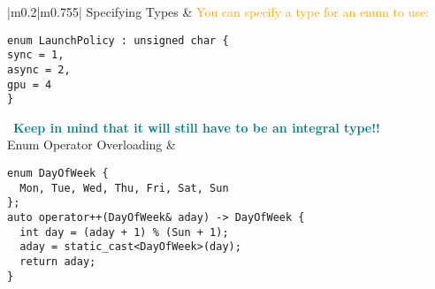 \documentclass[main.tex,fontsize=8pt,paper=a4,paper=portrait,DIV=calc,]{scrartcl}
\begin{document}
\begin{table}[ht!]
\begin{tabular}{|m{0.2\linewidth}|m{0.755\linewidth}|}
\hline
Specifying Types & 
\textcolor{orange}{You can specify a type for an enum to use:}\newline
\begin{lstlisting}
enum LaunchPolicy : unsigned char {
sync = 1,
async = 2,
gpu = 4
}
\end{lstlisting} 
\, \newline
\textcolor{teal}{\textbf{Keep in mind that it will still have to be an integral type!!}}\\
\hline
Enum Operator Overloading & 
\begin{lstlisting}
enum DayOfWeek {
  Mon, Tue, Wed, Thu, Fri, Sat, Sun
};
auto operator++(DayOfWeek& aday) -> DayOfWeek {
  int day = (aday + 1) % (Sun + 1);
  aday = static_cast<DayOfWeek>(day);
  return aday;
}
\end{lstlisting}\\
\hline
\end{tabular}

\end{table}
\end{document}
